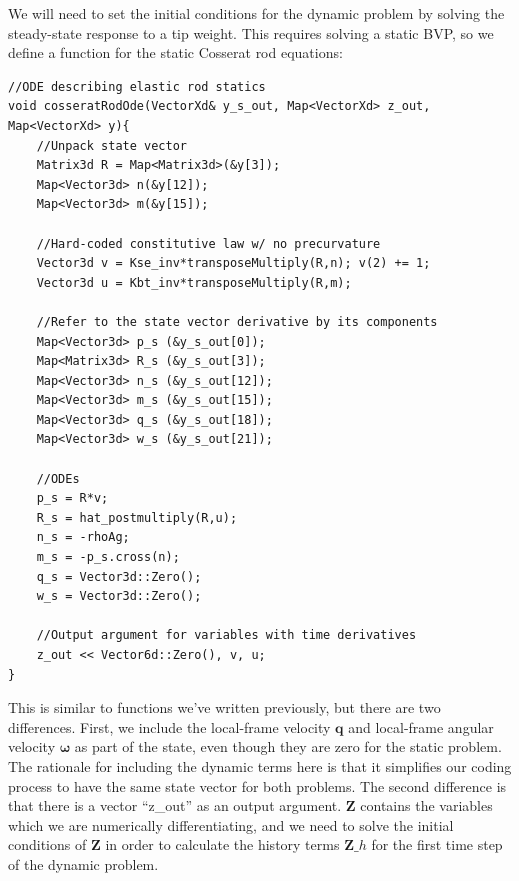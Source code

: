 \documentclass[12pt]{article}
\begin{document}
We will need to set the initial conditions for the dynamic problem by solving the steady-state response to a tip weight. This requires solving a static BVP, so we define a function for the static Cosserat rod equations:
\begin{lstlisting}
//ODE describing elastic rod statics
void cosseratRodOde(VectorXd& y_s_out, Map<VectorXd> z_out, Map<VectorXd> y){
    //Unpack state vector
    Matrix3d R = Map<Matrix3d>(&y[3]);
    Map<Vector3d> n(&y[12]);
    Map<Vector3d> m(&y[15]);

    //Hard-coded constitutive law w/ no precurvature
    Vector3d v = Kse_inv*transposeMultiply(R,n); v(2) += 1;
    Vector3d u = Kbt_inv*transposeMultiply(R,m);

    //Refer to the state vector derivative by its components
    Map<Vector3d> p_s (&y_s_out[0]);
    Map<Matrix3d> R_s (&y_s_out[3]);
    Map<Vector3d> n_s (&y_s_out[12]);
    Map<Vector3d> m_s (&y_s_out[15]);
    Map<Vector3d> q_s (&y_s_out[18]);
    Map<Vector3d> w_s (&y_s_out[21]);

    //ODEs
    p_s = R*v;
    R_s = hat_postmultiply(R,u);
    n_s = -rhoAg;
    m_s = -p_s.cross(n);
    q_s = Vector3d::Zero();
    w_s = Vector3d::Zero();

    //Output argument for variables with time derivatives
    z_out << Vector6d::Zero(), v, u;
}
\end{lstlisting}
This is similar to functions we've written previously, but there are two differences. First, we include the local-frame velocity $\boldsymbol{q}$ and local-frame angular velocity $\boldsymbol{\omega}$ as part of the state, even though they are zero for the static problem. The rationale for including the dynamic terms here is that it simplifies our coding process to have the same state vector for both problems. The second difference is that there is a vector ``z\_out'' as an output argument. $\boldsymbol{Z}$ contains the variables which we are numerically differentiating, and we need to solve the initial conditions of $\boldsymbol{Z}$ in order to calculate the history terms $\boldsymbol{Z}\_h$ for the first time step of the dynamic problem.
\end{document}
